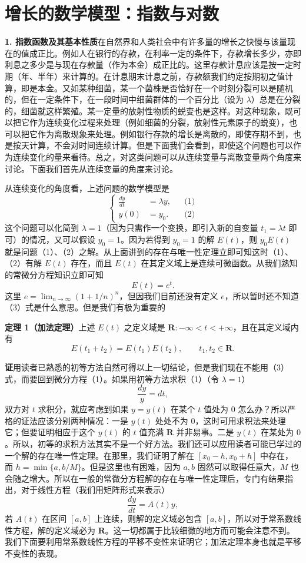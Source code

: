 \section{增长的数学模型：指数与对数}

\textbf{1. 指数函数及其基本性质}\quad 在自然界和人类社会中有许多量的增长之快慢与该量现在的值成正比。例如人在银行的存款，在利率一定的条件下，存款增长多少，亦即利息之多少是与现在存款量（作为本金）成正比的。这里存款计息应该是按一定时期（年、半年）来计算的。在计息期末计息之前，存款额我们约定按期初之值计算，即是本金。又如某种细菌，某一个菌株是否恰好在一个时刻分裂可以是随机的，但在一定条件下，在一段时间中细菌群体的一个百分比（设为 $\lambda$）总是在分裂的，细菌就这样繁殖。某一定量的放射性物质的蜕变也是这样。对这种现象，既可以把它作为连续变化过程来处理（例如细菌的分裂，放射性元素原子的蜕变），也可以把它作为离散现象来处理。例如银行存款的增长是离散的，即使存期不到，也是按天计算，不会对时间连续计算。但是下面我们会看到，即使这个问题也可以作为连续变化的量来看待。总之，对这类问题可以从连续变量与离散变量两个角度来讨论。下面我们首先从连续变量的角度来讨论。

从连续变化的角度看，上述问题的数学模型是
\[
\left\{
\begin{aligned}
\frac{dy}{dt}&=\lambda y, &&\text{(1)}\\
y(0)&=y_0. &&\text{(2)}
\end{aligned}
\right.
\]
这个问题可以化简到 $\lambda=1$（因为只需作一个变换，即引入新的自变量 $t_1=\lambda t$ 即可）的情况，又可以假设 $y_0=1$。因为若得到 $y_0=1$ 的解 $E(t)$，则 $y_0E(t)$ 就是问题（1）、（2）之解。从上面讲到的存在与唯一性定理立即可知这时（1）、（2）有解 $E(t)$ 存在，而且 $E(t)$ 在其定义域上是连续可微函数。从我们熟知的常微分方程知识立即可知
\[
E(t)=e^t. \tag{3}
\]
这里 $e=\lim_{n\to\infty}(1+1/n)^n$，但因我们目前还没有定义 $e$，所以暂时还不知道（3）式是什么意思。但是我们有极为重要的

\textbf{定理 1（加法定理）}\quad 上述 $E(t)$ 之定义域是 $\mathbf R:-\infty<t<+\infty$，且在其定义域内有
\[
E(t_1+t_2)=E(t_1)E(t_2),\qquad t_1,t_2\in\mathbf R. \tag{4}
\]

\textbf{证}\quad 用读者已熟悉的初等方法自然可得以上一切结论，但是我们现在不能用（3）式，而要回到微分方程（1）。如果用初等方法求积（1）（令 $\lambda=1$）
\[
\frac{dy}{y}=dt,
\]
双方对 $t$ 求积分，就应考虑到如果 $y=y(t)$ 在某个 $t$ 值处为 $0$ 怎么办？所以严格的证法应该分别两种情况：一是 $y(t)$ 处处不为 $0$，这时可用求积法来处理它；但要证明相应于这个 $y(t)$ 的 $t$ 值充满 $\mathbf R$ 并非易事。二是 $y(t)$ 在某处为 $0$。所以，初等的求积方法其实不是一个好方法。我们还可以应用读者可能已学过的一个解的存在唯一性定理。在那里，我们证明了解在 $[x_0-h,x_0+h]$ 中存在，而 $h=\min\{a,b/M\}$。但是这里也有困难，因为 $a,b$ 固然可以取得任意大，$M$ 也会随之增大。所以在一般的常微分方程解的存在与唯一性定理后，专门有结果指出，对于线性方程（我们用矩阵形式来表示）
\[
\frac{dy}{dt}=A(t)y,
\]
若 $A(t)$ 在区间 $[a,b]$ 上连续，则解的定义域必包含 $[a,b]$，所以对于常系数线性方程，解的定义域必为 $\mathbf R$。这一切都属于比较细微的地方而可能会注意不到。我们下面要利用常系数线性方程的平移不变性来证明它；加法定理本身也就是平移不变性的表现。

